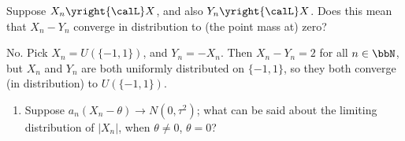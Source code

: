 \begin{problem}
  Suppose \(X_n\yright{\calL}X\), and also \(Y_n\yright{\calL} X\). Does
  this mean that \(X_n-Y_n\) converge in distribution to (the point mass
  at) zero?
\end{problem}
\begin{solution}
  No. Pick $X_n = U(\{-1,1\})$, and $Y_n = -X_n$. Then $X_n-Y_n = 2$ for
  all $n \in \bbN$, but $X_n$ and $Y_n$ are both uniformly distributed on
  $\{-1,1\}$, so they both converge (in distribution) to $U(\{-1,1\})$.

\end{solution}
\newpage

\begin{problem}[DasGupta 7.31 (a)]
  \begin{enumerate}[label=(\alph*),noitemsep]
  \item Suppose \(a_n(X_n-\theta)\to N(0,\tau^2)\); what can be said
    about the limiting distribution of \(|X_n|\), when \(\theta\neq 0\),
    \(\theta=0\)?
  \end{enumerate}
\end{problem}
\begin{solution}

\end{solution}

